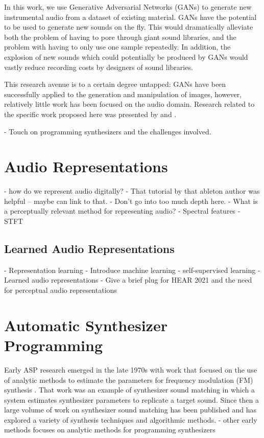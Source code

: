 In this work, we use Generative Adversarial Networks (GANs) \cite{goodfellow2014generative} to generate new instrumental audio from a dataset of existing material. GANs have the potential to be used to generate new sounds on the fly. This would dramatically alleviate both the problem of having to pore through giant sound libraries, and the problem with having to only use one sample repeatedly. In addition, the explosion of new sounds which could potentially be produced by GANs would vastly reduce recording costs by designers of sound libraries.

This research avenue is to a certain degree untapped: GANs have been successfully applied to the generation and manipulation of images, however, relatively little work has been focused on the audio domain. Research related to the specific work proposed here was presented by \cite{donahue2018adversarial}  and \cite{engel2018gansynth}.

- Touch on programming synthesizers and the challenges involved.

\section{Audio Representations}
- how do we represent audio digitally?
- That tutorial by that ableton author was helpful -- maybe can link to that.
- Don't go into too much depth here.
- What is a perceptually relevant method for representing audio?
- Spectral features
- STFT

\subsection{Learned Audio Representations}
- Representation learning \cite{bengio2013representation}
- Introduce machine learning
- self-supervised learning
- Learned audio representations
- Give a brief plug for HEAR 2021 and the need for perceptual audio representations

\section{Automatic Synthesizer Programming}
Early ASP research emerged in the late 1970s with work that focused on the use of analytic methods to estimate the parameters for frequency modulation (FM) synthesis \cite{justice1979analytic}. That work was an example of synthesizer sound matching in which a system estimates synthesizer parameters to replicate a target sound. Since then a large volume of work on synthesizer sound matching has been published and has explored a variety of synthesis techniques and algorithmic methods.
- other early methods focuses on analytic methods for programming synthesizers \cite{beauchamp1982synthesis, payne1987microcomputer, delprat1990parameter}

